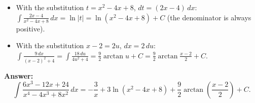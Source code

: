 \begin{solution}
\begin{itemize}
  \item With the substitution $t = x^2 - 4x + 8$, $dt = (2x - 4)\,dx$: $\int \frac{2x - 4}{x^2 - 4x + 8}\,dx = \ln|t| = \ln(x^2 - 4x + 8) + C$ (the denominator is always positive).
  \item With the substitution $x - 2 = 2u$, $dx = 2\,du$: $\int \frac{9\,dx}{(x - 2)^2 + 4} = \int \frac{18\,du}{4u^2 + 4} = \frac92\arctan u + C = \frac92 \arctan\frac{x - 2}{2} + C$.
\end{itemize}
\textbf{Answer:}
\[ \boxed{\int \frac{6x^3 - 12x + 24}{x^4 - 4x^3 + 8x^2}\,dx = -\frac{3}{x} + 3\ln(x^2 - 4x + 8) + \frac92\arctan\left(\frac{x - 2}{2}\right) + C.} \]
\end{solution}
